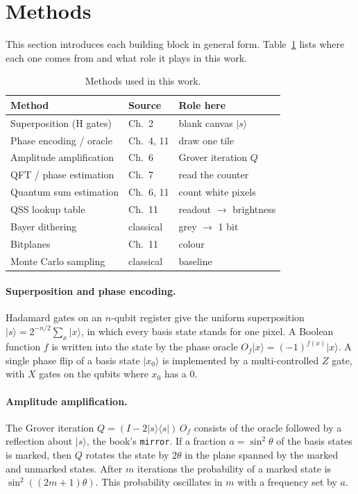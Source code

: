 \documentclass[10pt,twocolumn,a4paper]{article}
\newcommand{\ket}[1]{\lvert #1\rangle}
\newcommand{\bra}[1]{\langle #1\rvert}
\newcommand{\proj}[1]{\ket{#1}\!\bra{#1}}
\begin{document}
\section{Methods}\label{sec:methods}

This section introduces each building block in general form.
Table~\ref{tab:methods} lists where each one comes from and what role it
plays in this work.

\begin{table}[t]
\centering\footnotesize
\setlength{\tabcolsep}{3pt}
\caption{Methods used in this work.}
\label{tab:methods}
\begin{tabular}{lll}
\toprule
Method & Source & Role here\\
\midrule
Superposition (H gates) & Ch.~2 & blank canvas $\ket{s}$\\
Phase encoding / oracle & Ch.~4, 11 & draw one tile\\
Amplitude amplification & Ch.~6 & Grover iteration $Q$\\
QFT / phase estimation & Ch.~7 & read the counter\\
Quantum sum estimation & Ch.~6, 11 & count white pixels\\
QSS lookup table & Ch.~11 & readout $\to$ brightness\\
Bayer dithering & classical & grey $\to$ 1 bit\\
Bitplanes & Ch.~11 & colour\\
Monte Carlo sampling & classical & baseline\\
\bottomrule
\end{tabular}
\end{table}

\paragraph{Superposition and phase encoding.}
Hadamard gates on an $n$-qubit register give the uniform superposition
$\ket{s}=2^{-n/2}\sum_x\ket{x}$, in which every basis state stands for one
pixel. A Boolean function $f$ is written into the state by the phase oracle
$O_f\ket{x}=(-1)^{f(x)}\ket{x}$. A single phase flip of a basis state
$\ket{x_0}$ is implemented by a multi-controlled $Z$ gate, with $X$ gates on the
qubits where $x_0$ has a $0$.

\paragraph{Amplitude amplification.}
The Grover iteration $Q=(I-2\proj{s})\,O_f$ consists of the oracle followed
by a reflection about $\ket{s}$, the book's \texttt{mirror}. If a fraction
$a=\sin^2\theta$ of the basis states is marked, then $Q$ rotates the state by
$2\theta$ in the plane spanned by the marked and unmarked states. After $m$
iterations the probability of a marked state is $\sin^2((2m+1)\theta)$. This
probability oscillates in $m$ with a frequency set by $a$.
\end{document}

